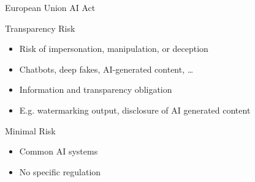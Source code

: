 \documentclass[ignorenonframetext,xcolor=x11names]{beamer}
\begin{document}
\begin{frame}[label=advanced]{European Union AI Act}
\begin{block}{Transparency Risk}
\begin{itemize}
   \item Risk of impersonation, manipulation, or deception
   \item Chatbots, deep fakes, AI-generated content, \ldots
   \item Information and transparency obligation
   \item E.g. watermarking output, disclosure of AI generated content
\end{itemize}
\end{block}

\begin{block}{Minimal Risk}
\begin{itemize}
   \item Common AI systems
   \item No specific regulation
\end{itemize}
\end{block}
\end{frame}
\end{document}
